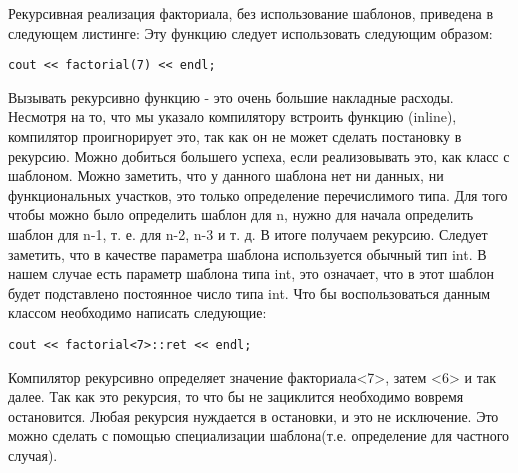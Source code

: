 Рекурсивная реализация факториала, без использование шаблонов, приведена в следующем листинге:
Эту функцию следует использовать следующим образом:
\begin{verbatim}
cout << factorial(7) << endl;
\end{verbatim}
Вызывать рекурсивно функцию - это очень большие накладные расходы. Несмотря на то, что мы указало компилятору встроить функцию (inline), компилятор проигнорирует это, так как он не может сделать постановку в рекурсию. Можно добиться большего успеха, если реализовывать это, как класс с шаблоном.
Можно заметить, что у данного шаблона нет ни данных, ни функциональных участков, это только определение перечислимого типа. Для того чтобы можно было определить шаблон для n, нужно для начала определить шаблон для n-1, т. е. для n-2, n-3 и т. д. В итоге получаем рекурсию. Следует заметить, что в качестве параметра шаблона используется обычный тип int. В нашем случае есть параметр шаблона типа int, это означает, что в этот шаблон будет подставлено постоянное число типа int. Что бы воспользоваться данным классом необходимо написать следующие:
\begin{verbatim}
cout << factorial<7>::ret << endl;
\end{verbatim}
Компилятор рекурсивно определяет значение факториала<7>, затем <6> и так далее. Так как это рекурсия, то что бы не зациклится необходимо вовремя остановится. Любая рекурсия нуждается в остановки, и это не исключение. Это можно сделать с помощью специализации шаблона(т.е. определение для частного случая).


